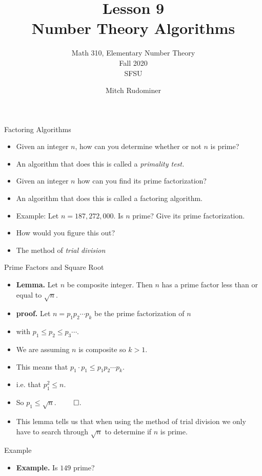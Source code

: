 \documentclass{beamer}
\title{Lesson 9 \\ Number Theory Algorithms}
\subtitle{Math 310, Elementary Number Theory \\ Fall 2020 \\ SFSU}
\author{Mitch Rudominer}
\date{}
\begin{document}
\begin{frame}
  \titlepage
\end{frame}

\begin{frame}{Factoring Algorithms}

\begin{itemize}
  \item Given an integer $n$, how can you determine whether or not $n$ is prime?
  \item An algorithm that does this is called a \emph{primality test.}
  \item Given an integer $n$ how can you find its prime factorization?
  \item An algorithm that does this is called a factoring algorithm.
  \item Example: Let $n=187,272,000$. Is $n$ prime? Give its prime factorization.
  \item How would you figure this out?
  \item The method of \emph{trial division}
\end{itemize}

\end{frame}

\begin{frame}{Prime Factors and Square Root}

\begin{itemize}
  \item \textbf{Lemma.} Let $n$ be composite integer. Then $n$ has a prime factor less than or equal to $\sqrt{n}$.
  \item \textbf{proof.} Let $n=p_1 p_2 \cdots p_k$ be the prime factorization of $n$
  \item with $p_1 \leq p_2 \leq p_3 \cdots$.
  \item We are assuming $n$ is composite so $k>1$.
  \item This means that $p_1 \cdot p_1 \leq p_1 p_2 \cdots p_k$.
  \item i.e. that $p_1^2 \leq n$.
  \item So $p_1 \leq \sqrt{n}.$ $\qed$.
  \item This lemma tells us that when using the method of trial division we only
  have to search through $\sqrt{n}$ to determine if $n$ is prime.
\end{itemize}
\end{frame}

\begin{frame}{Example}
\begin{itemize}
  \item \textbf{Example.} Is $149$ prime?
\end{itemize}

\end{frame}
\end{document}
